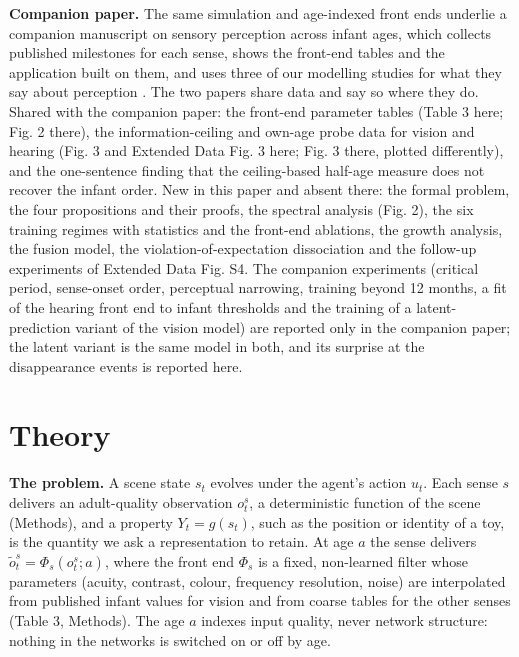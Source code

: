 \documentclass{article}
\begin{document}
\textbf{Companion paper.} The same simulation and age-indexed front ends underlie a companion manuscript on sensory perception across infant ages, which collects published milestones for each sense, shows the front-end tables and the application built on them, and uses three of our modelling studies for what they say about perception \autocite{mohapatra2026senses}. The two papers share data and say so where they do. Shared with the companion paper: the front-end parameter tables (Table 3 here; Fig. 2 there), the information-ceiling and own-age probe data for vision and hearing (Fig. 3 and Extended Data Fig. 3 here; Fig. 3 there, plotted differently), and the one-sentence finding that the ceiling-based half-age measure does not recover the infant order. New in this paper and absent there: the formal problem, the four propositions and their proofs, the spectral analysis (Fig. 2), the six training regimes with statistics and the front-end ablations, the growth analysis, the fusion model, the violation-of-expectation dissociation and the follow-up experiments of Extended Data Fig. S4. The companion experiments (critical period, sense-onset order, perceptual narrowing, training beyond 12 months, a fit of the hearing front end to infant thresholds and the training of a latent-prediction variant of the vision model) are reported only in the companion paper; the latent variant is the same model in both, and its surprise at the disappearance events is reported here.

\section{Theory}

\textbf{The problem.} A scene state \(s_t\) evolves under the agent's action \(u_t\). Each sense \(s\) delivers an adult-quality observation \(o_t^{s}\), a deterministic function of the scene (Methods), and a property \(Y_t=g(s_t)\), such as the position or identity of a toy, is the quantity we ask a representation to retain. At age \(a\) the sense delivers \(\tilde o_t^{s}=\Phi_s(o_t^{s};a)\), where the front end \(\Phi_s\) is a fixed, non-learned filter whose parameters (acuity, contrast, colour, frequency resolution, noise) are interpolated from published infant values for vision and from coarse tables for the other senses (Table 3, Methods). The age \(a\) indexes input quality, never network structure: nothing in the networks is switched on or off by age.
\end{document}
